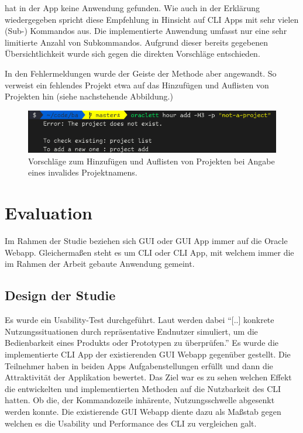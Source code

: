 \documentclass[oneside,bibliography=totocnumbered,BCOR=5mm]{scrbook}
\begin{document}
 hat in der App keine Anwendung gefunden. Wie
auch in der Erklärung wiedergegeben spricht \textcite{dutta} diese Empfehlung in
Hinsicht auf CLI Apps mit sehr vielen (Sub-) Kommandos aus. Die implementierte
Anwendung umfasst nur eine sehr limitierte Anzahl von Subkommandos. Aufgrund
dieser bereits gegebenen Übersichtlichkeit wurde sich gegen die direkten
Vorschläge entschieden.

In den Fehlermeldungen wurde der Geiste der Methode aber angewandt. So verweist
ein fehlendes Projekt etwa auf das Hinzufügen und Auflisten von Projekten hin
(siehe nachstehende Abbildung.)

\begin{figure}[H]
  \centering
  \includegraphics[scale=0.5]{recommendation-invalid-project.png}
  \caption{Vorschläge zum Hinzufügen und Auflisten von Projekten bei Angabe eines invalides Projektnamens.}
  \label{fig:recommendation-invalid-project}
\end{figure}

\chapter{Evaluation}
\label{sec:evaluation}

Im Rahmen der Studie beziehen sich GUI oder GUI App immer auf die Oracle Webapp.
Gleichermaßen steht es um CLI oder CLI App, mit welchem immer die im Rahmen der
Arbeit gebaute  Anwendung gemeint.

\section{Design der Studie}

Es wurde ein Usability-Test durchgeführt. Laut \cite[36]{hegner2003} werden
dabei ``[..] konkrete Nutzungssituationen durch repräsentative Endnutzer
simuliert, um die Bedienbarkeit eines Produkts oder Prototypen zu überprüfen.''
Es wurde die implementierte CLI App der existierenden GUI Webapp gegenüber
gestellt. Die Teilnehmer haben in beiden Apps Aufgabenstellungen erfüllt und
dann die Attraktivität der Applikation bewertet. Das Ziel war es zu sehen
welchen Effekt die entwickelten und implementierten Methoden auf die Nutzbarkeit
des CLI hatten. Ob die, der Kommandozeile inhärente, Nutzungsschwelle abgesenkt
werden konnte. Die existierende GUI Webapp diente dazu als Maßstab gegen welchen
es die Usability und Performance des CLI zu vergleichen galt.
\end{document}
